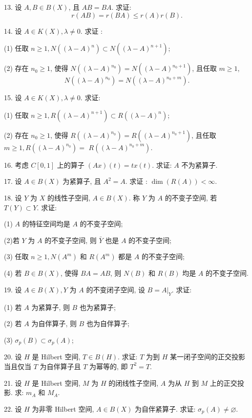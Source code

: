 \documentclass[openany]{ctexbook}
\theoremstyle{kaiti}
\theoremstyle{normal}
\begin{document}
13. 设 $A, B \in B(X)$, 且 $A B=B A$. 求证:
$$
r(A B)=r(B A) \leqslant r(A) r(B).
$$

14. 设 $A \in K(X), \lambda \neq 0$. 求证 :

(1) 任取 $n \geqslant 1, N\left((\lambda-A)^n\right) \subset N\left((\lambda-A)^{n+1}\right)$;

(2) 存在 $n_0 \geqslant 1$, 使得 $N\left((\lambda-A)^{n_0}\right)=N\left((\lambda-A)^{n_0+1}\right)$, 且任取 $m \geqslant 1$, 
$$
N\left((\lambda-A)^{n_0}\right)=N\left((\lambda-A)^{n_0+m}\right).
$$

15. 设 $A \in K(X), \lambda \neq 0$. 求证:

(1) 任取 $n \geqslant 1, R\left((\lambda-A)^{n+1}\right) \subset R\left((\lambda-A)^n\right)$;

(2) 存在 $n_0 \geqslant 1$, 使得 $R\left((\lambda-A)^{n_0}\right)=R\left((\lambda-A)^{n_0+1}\right)$, 且任取 $m \geqslant 1, R\left((\lambda-A)^{n_0}\right)=$ $R\left((\lambda-A)^{n_0+m}\right)$.

16. 考虑 $C[0,1]$ 上的算子 $(A x)(t)=t x(t)$. 求证: $A$ 不为紧算子.

17. 设 $A \in B(X)$ 为紧算子, 且 $A^2=A$. 求证 : $\operatorname{dim}(R(A))<\infty$.

18. 设 $Y$ 为 $X$ 的线性子空间, $A \in B(X)$. 称 $Y$ 为 $A$ 的不变子空间, 若 $T(Y) \subset Y$. 求证:

(1) $A$ 的特征空间均是 $A$ 的不变子空间;

(2)若 $Y$ 为 $A$ 的不变子空间, 则 $\bar{Y}$ 也是 $A$ 的不变子空间;

(3) 任取 $n \geqslant 1, N\left(A^m\right)$ 和 $R\left(A^m\right)$ 都是 $A$ 的不变子空间;

(4) 若 $B \in B(X)$, 使得 $B A=A B$, 则 $N(B)$ 和 $R(B)$ 均是 $A$ 的不变子空间.

19. 设 $A \in B(X), Y$ 为 $A$ 的不变闭子空间, 设 $B=\left.A\right|_{Y}$. 求证:

(1) 若 $A$ 为紧算子, 则 $B$ 也为紧算子;

(2) 若 $A$ 为自伴算子, 则 $B$ 也为自伴算子;

(3) $\sigma_{p}(B) \subset \sigma_{p}(A)$;

20. 设 $H$ 是 Hilbert 空间, $T \in B(H)$. 求证: $T$ 为到 $H$ 某一闭子空间的正交投影当且仅当 $T$ 为自伴算子且 $T$ 为幂等的, 即 $T^2=T$.

21. 设 $H$ 是 Hilbert 空间, $M$ 为 $H$ 的闭线性子空间, $A$ 为从 $H$ 到 $M$ 上的正交投影. 求: $m_{A}$ 和 $M_{A}$.

22. 设 $H$ 为非零 Hilbert 空间, $A \in B(X)$ 为自伴紧算子. 求证: $\sigma_{p}(A) \neq \varnothing$.
\end{document}
